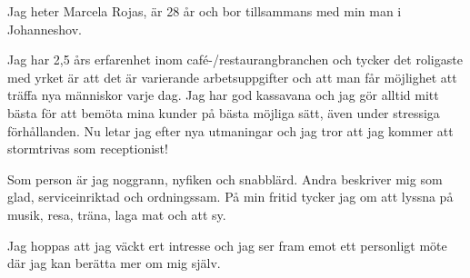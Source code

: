 \documentclass[11pt,a4paper,sans]{moderncv}        %
\begin{document}
Jag heter Marcela Rojas, är 28 år och bor tillsammans med min man i Johanneshov.

Jag har 2,5 års erfarenhet inom café-/restaurangbranchen och tycker det roligaste med yrket är att det är varierande arbetsuppgifter och att man får möjlighet att träffa nya människor varje dag. Jag har god kassavana och jag gör alltid mitt bästa för att bemöta mina kunder på bästa möjliga sätt, även under stressiga förhållanden. Nu letar jag efter nya utmaningar och jag tror att jag kommer att stormtrivas som receptionist!

Som person är jag noggrann, nyfiken och snabblärd. Andra beskriver mig som glad, serviceinriktad och ordningssam. På min fritid tycker jag om att lyssna på musik, resa, träna, laga mat och att sy.

Jag hoppas att jag väckt ert intresse och jag ser fram emot ett personligt möte där jag kan berätta mer om mig själv.

\makeletterclosing

\end{document}

